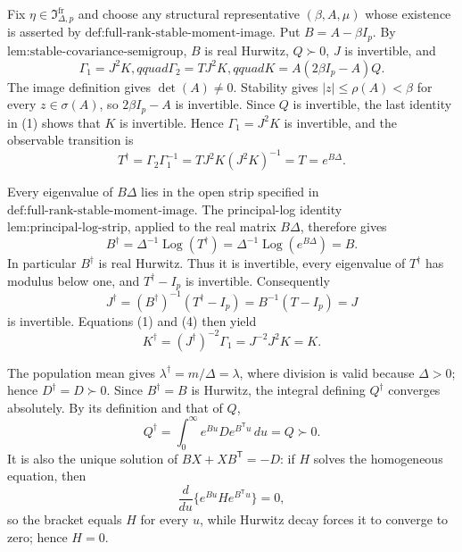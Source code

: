 Fix \(\eta\in\mathfrak I_{\Delta,p}^{\mathrm{fr}}\) and choose any structural representative \((\beta,A,\mu)\) whose existence is asserted by \(\text{def:full-rank-stable-moment-image}\).  Put \(B=A-\beta I_p\).  By \(\text{lem:stable-covariance-semigroup}\), \(B\) is real Hurwitz, \(Q\succ0\), \(J\) is invertible, and
\[
 \Gamma_1=J^2K,qquad \Gamma_2=TJ^2K,qquad
 K=A(2\beta I_p-A)Q.
\tag{1}
\]
The image definition gives \(\det(A)\neq0\).  Stability gives \(|z|\leq\rho(A)<\beta\) for every \(z\in\sigma(A)\), so \(2\beta I_p-A\) is invertible.  Since \(Q\) is invertible, the last identity in (1) shows that \(K\) is invertible.  Hence \(\Gamma_1=J^2K\) is invertible, and the observable transition is
\[
 T^\dagger=\Gamma_2\Gamma_1^{-1}
 =TJ^2K(J^2K)^{-1}=T=e^{B\Delta}.
\tag{2}
\]

Every eigenvalue of \(B\Delta\) lies in the open strip specified in \(\text{def:full-rank-stable-moment-image}\).  The principal-log identity \(\text{lem:principal-log-strip}\), applied to the real matrix \(B\Delta\), therefore gives
\[
 B^\dagger=\Delta^{-1}\operatorname{Log}(T^\dagger)
 =\Delta^{-1}\operatorname{Log}(e^{B\Delta})=B.
\tag{3}
\]
In particular \(B^\dagger\) is real Hurwitz.  Thus it is invertible, every eigenvalue of \(T^\dagger\) has modulus below one, and \(T^\dagger-I_p\) is invertible.  Consequently
\[
 J^\dagger=(B^\dagger)^{-1}(T^\dagger-I_p)
 =B^{-1}(T-I_p)=J
\tag{4}
\]
is invertible.  Equations (1) and (4) then yield
\[
 K^\dagger=(J^\dagger)^{-2}\Gamma_1=J^{-2}J^2K=K.
\tag{5}
\]

The population mean gives \(\lambda^\dagger=m/\Delta=\lambda\), where division is valid because \(\Delta>0\); hence \(D^\dagger=D\succ0\).  Since \(B^\dagger=B\) is Hurwitz, the integral defining \(Q^\dagger\) converges absolutely.  By its definition and that of \(Q\),
\[
 Q^\dagger=\int_0^\infty e^{Bu}De^{B^{\mathsf T}u}\,du=Q\succ0.
\tag{6}
\]
It is also the unique solution of \(BX+XB^{\mathsf T}=-D\): if \(H\) solves the homogeneous equation, then
\[
 \frac{d}{du}\{e^{Bu}He^{B^{\mathsf T}u}\}=0,
\]
so the bracket equals \(H\) for every \(u\), while Hurwitz decay forces it to converge to zero; hence \(H=0\).

